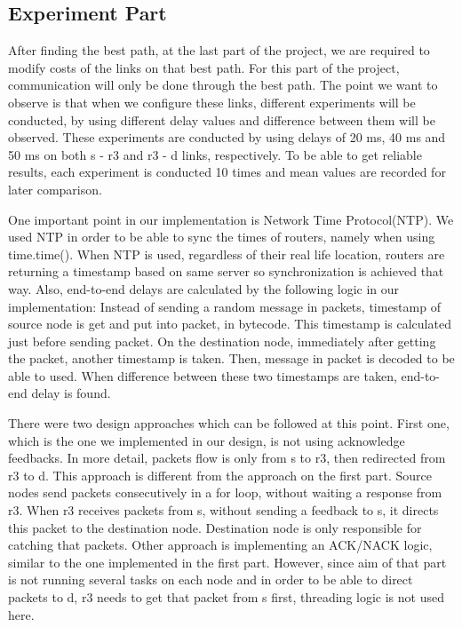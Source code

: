 \documentclass[conference]{IEEEtran}
\begin{document}
\subsection{Experiment Part}
After finding the best path, at the last part of the project, we are required to modify costs of the links on that best path. For this part of the project, communication will only be done through the best path. The point we want to observe is that when we configure these links, different experiments will be conducted, by using different delay values and difference between them will be observed. These experiments are conducted by using delays of 20 ms, 40 ms and 50 ms on both s - r3 and r3 - d links, respectively. To be able to get reliable results, each experiment is conducted 10 times and mean values are recorded for later comparison. 

One important point in our implementation is Network Time Protocol(NTP). We used NTP in order to be able to sync the times of routers, namely when using time.time(). When NTP is used, regardless of their real life location, routers are returning a timestamp based on same server so synchronization is achieved that way. Also, end-to-end delays are calculated by the following logic in our implementation: Instead of sending a random message in packets, timestamp of source node is get and put into packet, in bytecode. This timestamp is calculated just before sending packet. On the destination node, immediately after getting the packet, another timestamp is taken. Then, message in packet is decoded to be able to used. When difference between these two timestamps are taken, end-to-end delay is found. 

There were two design approaches which can be followed at this point. First one, which is the one we implemented in our design, is not using acknowledge feedbacks. In more detail, packets flow is only from s to r3, then redirected from r3 to d. This approach is different from the approach on the first part. Source nodes send packets consecutively in a for loop, without waiting a response from r3. When r3 receives packets from s, without sending a feedback to s, it directs this packet to the destination node. Destination node is only responsible for catching that packets. Other approach is implementing an ACK/NACK logic, similar to the one implemented in the first part. However, since aim of that part is not running several tasks on each node and in order to be able to direct packets to d, r3 needs to get that packet from s first, threading logic is not used here. 
\end{document}
